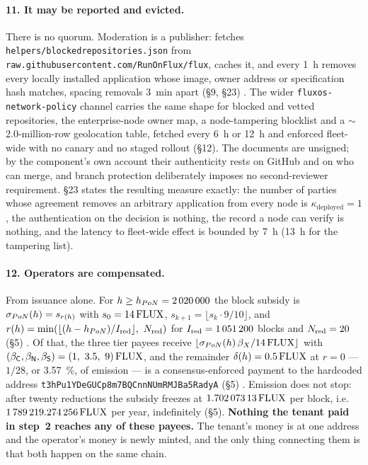 \paragraph{11. It may be reported and evicted.}
There is no quorum. Moderation is a publisher: \FluxOS fetches
\texttt{helpers/\allowbreak{}blockedrepositories.\allowbreak{}json} from \texttt{raw.\allowbreak{}githubusercontent.\allowbreak{}com/\allowbreak{}RunOnFlux/\allowbreak{}flux},
caches it, and every \SI{1}{\hour} removes every locally installed application whose image, owner
address or specification hash matches, spacing removals \SI{3}{\minute} apart (\S9, \S23)
. The wider
\texttt{fluxos-\allowbreak{}network-\allowbreak{}policy} channel carries the same shape for blocked and vetted repositories,
the enterprise-node owner map, a node-tampering blocklist and a $\sim$2.0-million-row geolocation
table, fetched every \SI{6}{\hour} or \SI{12}{\hour} and enforced fleet-wide with no canary and no
staged rollout (\S12). The documents are unsigned; by the component's own account their authenticity
rests on GitHub and on who can merge, and branch protection deliberately imposes no second-reviewer
requirement. \S23 states the resulting measure exactly: the number of parties whose agreement removes
an arbitrary application from every node is $\kappa_{\mathrm{deployed}} = 1$, the authentication on
the decision is nothing, the record a node can verify is nothing, and the latency to fleet-wide
effect is bounded by \SI{7}{\hour} (\SI{13}{\hour} for the tampering list).

\paragraph{12. Operators are compensated.}
From issuance alone. For $h \ge h_{PoN} = \num{2020000}$ the block subsidy is
$\sigma_{PoN}(h) = s_{r(h)}$ with $s_0 = 14\,\mathrm{FLUX}$, $s_{k+1} = \lfloor s_k \cdot 9/10 \rfloor$,
and $r(h) = \min(\lfloor (h - h_{PoN})/I_{\mathrm{red}} \rfloor,\ N_{\mathrm{red}})$ for
$I_{\mathrm{red}} = \num{1051200}$ blocks and $N_{\mathrm{red}} = 20$ (\S5)
. Of that, the three tier payees receive
$\lfloor \sigma_{PoN}(h)\,\beta_{X}/14\,\mathrm{FLUX} \rfloor$ with
$(\tbase{\tC},\tbase{\tN},\tbase{\tS}) = (1,\ 3.5,\ 9)\flux$, and the remainder
$\delta(h) = 0.5\,\mathrm{FLUX}$ at $r = 0$ --- $1/28$, or \SI{3.57}{\percent}, of \PoN emission --- is a
consensus-enforced payment to the hardcoded address \texttt{t3h\allowbreak{}Pu1YDe\allowbreak{}GUCp8m7BQCnn\allowbreak{}NUm\allowbreak{}RMJBa5Rady\allowbreak{}A}
(\S5) . Emission does not stop: after twenty reductions the
subsidy freezes at $\num{1.70207313}\,\mathrm{FLUX}$ per block, i.e.\ $\num{1789219.274256}\,\mathrm{FLUX}$ per year,
indefinitely (\S5). \textbf{Nothing the tenant paid in step~2 reaches any of these payees.} The
tenant's money is at one address and the operator's money is newly minted, and the only thing
connecting them is that both happen on the same chain.

